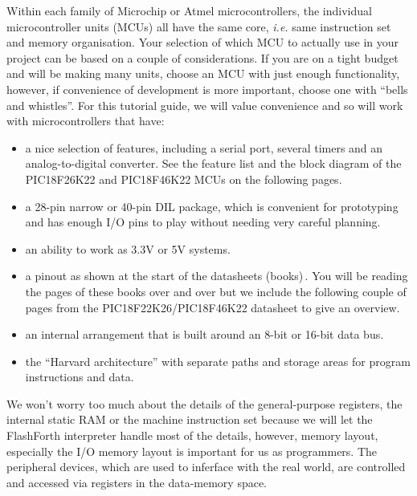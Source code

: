 \documentclass[12pt,a4paper]{article}
\begin{document}
\medskip\noindent
Within each family of Microchip or Atmel microcontrollers, 
the individual microcontroller units (MCUs) all have the same core, 
\emph{i.e.} same instruction set and memory organisation.
Your selection of which MCU to actually use in your project can be based on
a couple of considerations.
If you are on a tight budget and will be making many units, 
choose an MCU with just enough functionality, however,
if convenience of development is more important, 
choose one with ``bells and whistles''. 
For this tutorial guide, we will value convenience and so 
will work with microcontrollers that have:
\begin{itemize}
  \item a nice selection of features, including a serial port, 
     several timers and an analog-to-digital converter.
     See the feature list and the block diagram of the PIC18F26K22 and 
     PIC18F46K22 MCUs on the following pages.
  \item a 28-pin narrow or 40-pin DIL package, which is convenient for prototyping and
     has enough I/O pins to play without needing very careful planning.
  \item an ability to work as 3.3V or 5V systems.
  \item a pinout as shown at the start of the datasheets 
     (books)\,\cite{pic18f26k22-datasheet,pic24fv32ka302-datasheet,atmega328-datasheet}.
     You will be reading the pages of these books over and over but we include 
     the following couple of pages from the PIC18F22K26/PIC18F46K22 datasheet to give an overview.
  \item an internal arrangement that is built around an 8-bit or 16-bit data bus.
  \item the ``Harvard architecture'' with separate paths and storage areas for program 
     instructions and data.
\end{itemize}
We won't worry too much about the details of the general-purpose registers,
the internal static RAM or the machine instruction set because we will let
the FlashForth interpreter handle most of the details, however, 
memory layout, especially the I/O memory layout is important for us as programmers.
The peripheral devices, which are used to inferface with the real world,
are controlled and accessed via registers in the data-memory space.
\end{document}
